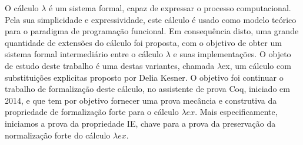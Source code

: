 O cálculo $\lambda$ é um sistema formal, capaz de expressar o processo
computacional.  Pela sua simplicidade e expressividade, este cálculo é usado
como modelo teórico para o paradigma de programação funcional. Em consequência
disto, uma grande quantidade de extensões do cálculo foi proposta, com o
objetivo de obter um sistema formal intermediário entre o cálculo $\lambda$ e suas
implementações.  O objeto de estudo deste trabalho é uma destas variantes,
chamada $\lambda$ex, um cálculo com substituições explicitas proposto por Delia
Kesner. O objetivo foi continuar o trabalho de formalização deste cálculo, no
assistente de prova Coq, iniciado em 2014, e que tem por objetivo fornecer
uma prova mecância e construtiva da propriedade de formalização forte para o
cálculo $\lambda ex$. Mais especificamente, iniciamos a prova da
propriedade IE, chave para a prova da preservação da normalização forte do
cálculo $\lambda ex$.

